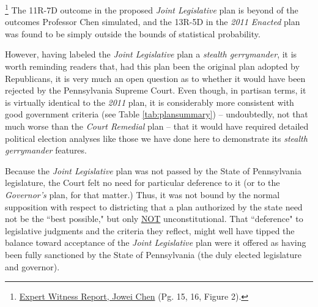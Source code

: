         \footnote{\href{https://www.pubintlaw.org/wp-content/uploads/2017/06/Expert-Report-Jowei-Chen.pdf}{Expert Witness Report, Jowei Chen} (Pg. 15, 16, Figure 2).}
The 11R-7D outcome in the proposed \textit{Joint Legislative} plan is beyond  of the  outcomes Professor Chen simulated, and the 13R-5D in the \textit{2011 Enacted} plan was found to be simply outside the bounds of statistical probability. 
\par
However, having labeled the \textit{Joint Legislative} plan a \textit{stealth gerrymander}, it is worth reminding readers that, had this plan been the original plan adopted by Republicans, it is very much an open question as to whether it would have been rejected by the Pennsylvania Supreme Court. Even though, in partisan terms, it is virtually identical to the \textit{2011} plan, it is considerably more consistent with good government criteria (see Table \ref{tab:plansummary}) -- undoubtedly, not that much worse than the \textit{Court Remedial} plan -- that it would have required detailed political election analyses like those we have done here to demonstrate its \textit{stealth gerrymander} features.
\par
Because the \textit{Joint Legislative} plan was not passed by the State of Pennsylvania legislature, the Court felt no need for particular deference to it (or to the \textit{Governor’s} plan, for that matter.) Thus, it was not bound by the normal supposition with respect to districting that a plan authorized by the state need not be the ``best possible," but only \underline{NOT} unconstitutional. That ``deference" to legislative judgments and the criteria they reflect, might well have tipped the balance toward acceptance of the \textit{Joint Legislative} plan were it offered as having been fully sanctioned by the State of Pennsylvania (the duly elected legislature and governor).

